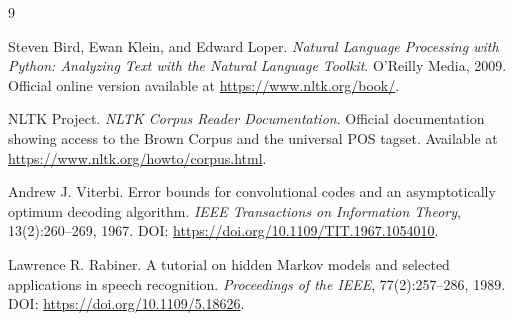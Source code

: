 \documentclass[12pt,a4paper]{article}
\begin{document}
\begin{thebibliography}{9}

Steven Bird, Ewan Klein, and Edward Loper.
\textit{Natural Language Processing with Python: Analyzing Text with the Natural Language Toolkit}.
O'Reilly Media, 2009. Official online version available at
\url{https://www.nltk.org/book/}.

NLTK Project.
\textit{NLTK Corpus Reader Documentation}.
Official documentation showing access to the Brown Corpus and the universal POS
tagset. Available at \url{https://www.nltk.org/howto/corpus.html}.

Andrew J. Viterbi.
Error bounds for convolutional codes and an asymptotically optimum decoding
algorithm.
\textit{IEEE Transactions on Information Theory}, 13(2):260--269, 1967.
DOI: \url{https://doi.org/10.1109/TIT.1967.1054010}.

Lawrence R. Rabiner.
A tutorial on hidden Markov models and selected applications in speech
recognition.
\textit{Proceedings of the IEEE}, 77(2):257--286, 1989.
DOI: \url{https://doi.org/10.1109/5.18626}.

\end{thebibliography}
\end{document}
